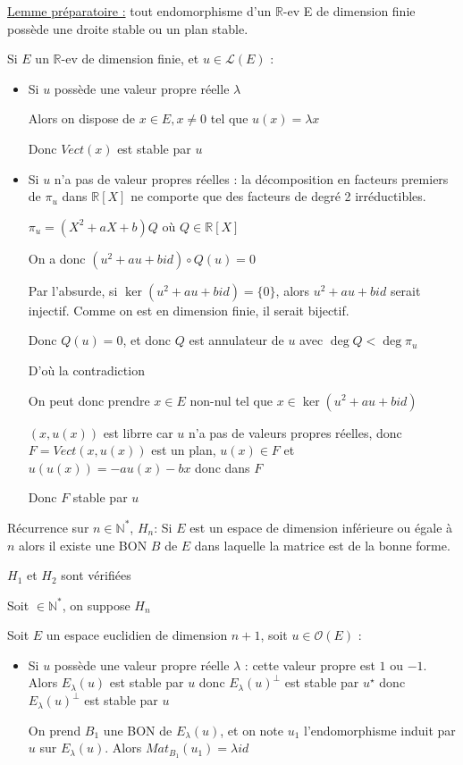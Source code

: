 \documentclass[a4paper,12pt]{book}
\newcommand{\Pre}[1]{\begin{tcolorbox}[sharp corners, colback=white,colframe=green!60!green!30!black!75, title=Preuve]#1\end{tcolorbox}}
\def\R{\mathbb{R}}
\def\N{\mathbb{N}}
\begin{document}
\Pre{\underline{Lemme préparatoire :} tout endomorphisme d'un $\R$-ev E de dimension finie possède une droite stable ou un plan stable.
\par Si $E$ un $\R$-ev de dimension finie, et $u\in\mathcal{L}(E)$ :\begin{itemize}
\item Si $u$ possède une valeur propre réelle $\lambda$
\par Alors on dispose de $x\in E, x\neq 0$ tel que $u(x)=\lambda x$
\par Donc $Vect(x)$ est stable par $u$
\item Si $u$ n'a pas de valeur propres réelles : la décomposition en facteurs premiers de $\pi_u$ dans $\R[X]$ ne comporte que des facteurs de degré 2 irréductibles.
\par $\pi_u = (X^2+aX+b)Q$ où $Q\in\R[X]$
\par On a donc $(u^2 + au + bid)\circ Q(u) =0$
\par Par l'absurde, si $\ker (u^2+au+bid) = \{0\}$, alors $u^2+au+bid$ serait injectif. Comme on est en dimension finie, il serait bijectif.
\par Donc $Q(u)=0$, et donc $Q$ est annulateur de $u$ avec $\deg Q < \deg \pi_u$
\par D'où la contradiction
\par On peut donc prendre $x\in E$ non-nul tel que $x\in\ker (u^2+au+bid)$
\par $(x, u(x))$ est librre car $u$ n'a pas de valeurs propres réelles, donc $F = Vect(x, u(x))$ est un plan, $u(x)\in F$ et $u(u(x))=-au(x)-bx$ donc dans $F$
\par Donc $F$ stable par $u$ 
\end{itemize}
Récurrence sur $n\in\N^*$, $H_n$: Si $E$ est un espace de dimension inférieure ou égale à $n$ alors il existe une BON $B$ de $E$ dans laquelle la matrice est de la bonne forme.
\par $H_1$ et $H_2$ sont vérifiées
\par Soit $\in \N^*$, on suppose $H_n$
\par Soit $E$ un espace euclidien de dimension $n+1$, soit $u\in\mathcal{O}(E)$ :\begin{itemize}
\item Si $u$ possède une valeur propre réelle $\lambda$ : cette valeur propre est $1$ ou $-1$. Alors $E_\lambda(u)$ est stable par $u$ donc $E_\lambda(u)^\perp$ est stable par $u^\star$ donc $E_\lambda(u)^\perp$ est stable par $u$
\par On prend $B_1$ une BON de $E_\lambda(u)$, et on note $u_1$ l'endomorphisme induit par $u$ sur $E_\lambda(u)$. Alors $Mat_{B_1}(u_1) = \lambda id$

\end{itemize}}
\end{document}
